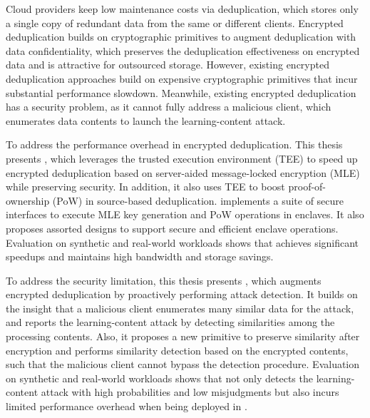 \begin{englishabstract}
    Cloud providers keep low maintenance costs via deduplication, which stores only a single copy of redundant data from the same or different clients.
    Encrypted deduplication builds on cryptographic primitives to augment deduplication with data confidentiality, which preserves the deduplication effectiveness on encrypted data and is attractive for outsourced storage. However, existing encrypted deduplication approaches build on expensive cryptographic primitives that incur substantial performance slowdown. Meanwhile, existing encrypted deduplication has a security problem, as it cannot fully address a malicious client, which enumerates data contents to launch the learning-content attack.

    To address the performance overhead in encrypted deduplication. This thesis presents \sysnameS, which leverages the trusted execution environment (TEE) to speed up encrypted deduplication based on server-aided message-locked encryption (MLE) while preserving security. In addition, it also uses TEE to boost proof-of-ownership (PoW) in source-based deduplication. \sysnameS implements a suite of secure interfaces to execute MLE key generation and PoW operations in enclaves. It also proposes assorted designs to support secure and efficient enclave operations. Evaluation on synthetic and real-world workloads shows that \sysnameS achieves significant speedups and maintains high bandwidth and storage savings.

    To address the security limitation, this thesis presents \sysnameF, which augments encrypted deduplication by proactively performing attack detection. It builds on the insight that a malicious client enumerates many similar data for the attack, and reports the learning-content attack by detecting similarities among the processing contents. Also, it proposes a new primitive to preserve similarity after encryption and performs similarity detection based on the encrypted contents, such that the malicious client cannot bypass the detection procedure. Evaluation on synthetic and real-world workloads shows that \sysnameF not only detects the learning-content attack with high probabilities and low misjudgments but also incurs limited performance overhead when being deployed in \sysnameS.

\end{englishabstract}